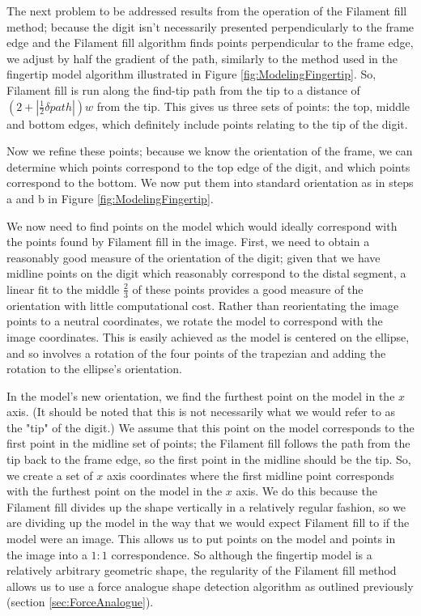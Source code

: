 The next problem to be addressed results from the operation of the Filament fill method; because the digit isn't necessarily presented perpendicularly to the frame edge and the Filament fill algorithm finds points perpendicular to the frame edge, we adjust by half the gradient of the path, similarly to the method used in the fingertip model algorithm illustrated in Figure \ref{fig:ModelingFingertip}. So, Filament fill is run along the find-tip path from the tip to a distance of $(2+\left\lvert\frac{1}{2}\delta path\right\lvert)w$ from the tip. This gives us three sets of points: the top, middle and bottom edges, which definitely include points relating to the tip of the digit.

Now we refine these points; because we know the orientation of the frame, we can determine which points correspond to the top edge of the digit, and which points correspond to the bottom. We now put them into standard orientation as in steps a and b in Figure \ref{fig:ModelingFingertip}. 

We now need to find points on the model which would ideally correspond with the points found by Filament fill in the image. First, we need to obtain a reasonably good measure of the orientation of the digit; given that we have midline points on the digit which reasonably correspond to the distal segment, a linear fit to the middle $\frac{2}{3}$ of these points provides a good measure of the orientation with little computational cost. Rather than reorientating the image points to a neutral coordinates, we rotate the model to correspond with the image coordinates. This is easily achieved as the model is centered on the ellipse, and so involves a rotation of the four points of the trapezian and adding the rotation to the ellipse's orientation.

In the model's new orientation, we find the furthest point on the model in the $x$ axis. (It should be noted that this is not necessarily what we would refer to as the "tip" of the digit.) We assume that this point on the model corresponds to the first point in the midline set of points; the Filament fill follows the path from the tip back to the frame edge, so the first point in the midline should be the tip. So, we create a set of $x$ axis coordinates where the first midline point corresponds with the furthest point on the model in the $x$ axis. We do this because the Filament fill divides up the shape vertically in a relatively regular fashion, so we are dividing up the model in the way that we would expect Filament fill to if the model were an image. This allows us to put points on the model and points in the image into a $1:1$ correspondence. So although the fingertip model is a relatively arbitrary geometric shape, the regularity of the Filament fill method allows us to use a force analogue shape detection algorithm as outlined previously (section \ref{sec:ForceAnalogue}).

